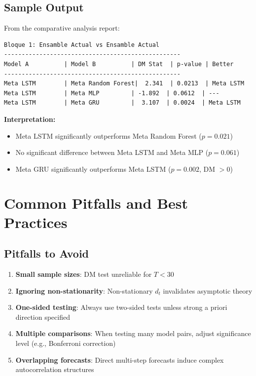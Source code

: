 \documentclass[11pt,a4paper]{article}
\begin{document}
\subsection{Sample Output}

From the comparative analysis report:

\begin{verbatim}
Bloque 1: Ensamble Actual vs Ensamble Actual
--------------------------------------------------
Model A          | Model B          | DM Stat  | p-value | Better
--------------------------------------------------
Meta LSTM        | Meta Random Forest|  2.341  | 0.0213  | Meta LSTM
Meta LSTM        | Meta MLP         | -1.892  | 0.0612  | ---
Meta LSTM        | Meta GRU         |  3.107  | 0.0024  | Meta LSTM
\end{verbatim}

\textbf{Interpretation:}
\begin{itemize}
    \item Meta LSTM significantly outperforms Meta Random Forest ($p = 0.021$)
    \item No significant difference between Meta LSTM and Meta MLP ($p = 0.061$)
    \item Meta GRU significantly outperforms Meta LSTM ($p = 0.002$, DM $> 0$)
\end{itemize}

\section{Common Pitfalls and Best Practices}

\subsection{Pitfalls to Avoid}

\begin{enumerate}
    \item \textbf{Small sample sizes}: DM test unreliable for $T < 30$
    \item \textbf{Ignoring non-stationarity}: Non-stationary $d_t$ invalidates asymptotic theory
    \item \textbf{One-sided testing}: Always use two-sided tests unless strong a priori direction specified
    \item \textbf{Multiple comparisons}: When testing many model pairs, adjust significance level (e.g., Bonferroni correction)
    \item \textbf{Overlapping forecasts}: Direct multi-step forecasts induce complex autocorrelation structures
\end{enumerate}
\end{document}
